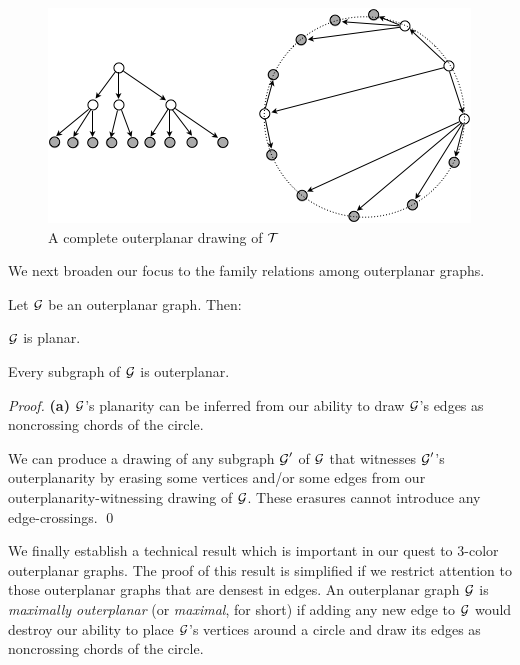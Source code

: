 \begin{figure}[hbt]
\begin{center}
       \includegraphics[scale=0.45]{FiguresGraph/TreeOutplanar3}
       \caption{A complete outerplanar drawing of $\mbox{$\cal T$}$}
  \label{fig:treeoutplanar3}
\end{center}
\end{figure}

\medskip

We next broaden our focus to the family relations among outerplanar graphs.

\begin{prop}
\label{thm:basic-outerplanar-stuff}
Let $\mbox{$\cal G$}$ be an outerplanar graph.  Then:

\smallskip

$\mbox{$\cal G$}$ is planar.

\smallskip

Every subgraph of $\mbox{$\cal G$}$ is outerplanar.
\end{prop}

\begin{proof}
{\bf (a)}
$\mbox{$\cal G$}$'s planarity can be inferred from our ability to draw $\mbox{$\cal G$}$'s edges as noncrossing chords of the circle.

\medskip

We can produce a drawing of any subgraph  $\mbox{$\cal G$}'$ of $\mbox{$\cal G$}$ that witnesses $\mbox{$\cal G$}'$'s outerplanarity by erasing some vertices and/or some edges from our outerplanarity-witnessing drawing of $\mbox{$\cal G$}$.  These erasures cannot introduce any edge-crossings.  \qed
\end{proof}

We finally establish a technical result which is important in our quest to $3$-color outerplanar graphs.  The proof of this result is simplified if we restrict attention to those outerplanar graphs that are densest in edges.   An outerplanar graph $\mbox{$\cal G$}$ is {\em maximally outerplanar} (or {\em maximal}, for short) if adding any new edge to $\mbox{$\cal G$}$ would destroy our ability to place $\mbox{$\cal G$}$'s vertices around a circle and draw its edges as noncrossing chords of the circle.

